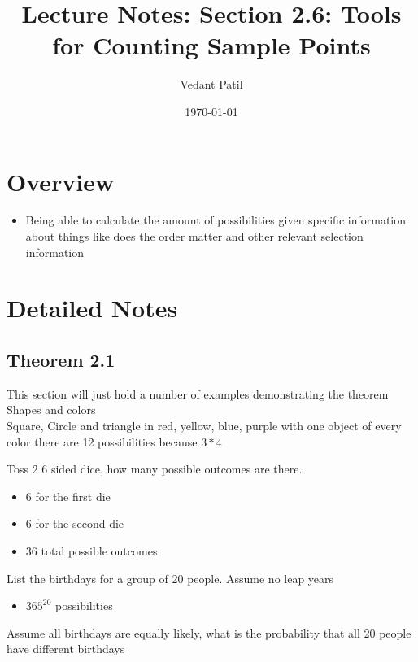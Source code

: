 \documentclass[12pt,a4paper]{article}
\title{Lecture Notes: Section 2.6: Tools for Counting Sample Points}
\author{Vedant Patil}
\date{\today}
\begin{document}
\maketitle

\section{Overview}
\begin{tcolorbox}[colback=yellow!10!white,colframe=yellow!50!black,title=Key Points]
  \begin{itemize}
    \item Being able to calculate the amount of possibilities given specific information about things like does the order matter and other relevant selection information 
  \end{itemize}
\end{tcolorbox}

\section{Detailed Notes}
\subsection{Theorem 2.1}
This section will just hold a number of examples demonstrating the theorem 
\vspace{12pt}
Shapes and colors \\ 
Square, Circle and triangle in red, yellow, blue, purple with one object of every color there are 12 possibilities because \( 3 * 4 \)

\vspace{12pt} 
Toss 2 6 sided dice, how many possible outcomes are there. \\ 
\begin{itemize}
  \item 6 for the first die 
  \item 6 for the second die 
  \item 36 total possible outcomes 
\end{itemize}

\vspace{12pt}
List the birthdays for a group of 20 people. Assume no leap years 
\begin{itemize}
  \item \( 365^{20} \) possibilities
\end{itemize}

Assume all birthdays are equally likely, what is the probability that all 20 people have different birthdays \\
\vspace{12pt}
\end{document}
